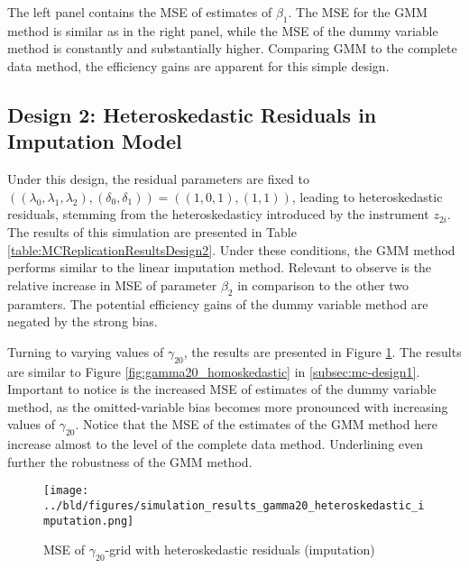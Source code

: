 The left panel contains the MSE of estimates of $\beta_1$.
The MSE for the GMM method is similar as in the right panel, while the MSE of the dummy variable method is constantly and substantially higher.
Comparing GMM to the complete data method, the efficiency gains are apparent for this simple design.

\subsection{Design 2: Heteroskedastic Residuals in Imputation Model}
Under this design, the residual parameters are fixed to $((\lambda_0, \lambda_1, \lambda_2), (\delta_0, \delta_1)) = ((1, 0, 1), (1, 1))$, leading to heteroskedastic residuals, stemming from the heteroskedasticy introduced by the instrument $z_{2i}$.
The results of this simulation are presented in Table \ref{table:MCReplicationResultsDesign2}.
Under these conditions, the GMM method performs similar to the linear imputation method.
Relevant to observe is the relative increase in MSE of parameter $\beta_2$ in comparison to the other two paramters.
The potential efficiency gains of the dummy variable method are negated by the strong bias.



Turning to varying values of $\gamma_{20}$, the results are presented in Figure \ref{fig:gamma20_heteroskedastic_imputation}.
The results are similar to Figure \ref{fig:gamma20_homoskedastic} in \ref{subsec:mc-design1}.
Important to notice is the increased MSE of estimates of the dummy variable method, as the omitted-variable bias becomes more pronounced with increasing values of $\gamma_{20}$.
Notice that the MSE of the estimates of the GMM method here increase almost to the level of the complete data method.
Underlining even further the robustness of the GMM method.

\begin{figure}[H]
    \centering
    \texttt{[image: ../bld/figures/simulation\_results\_gamma20\_heteroskedastic\_imputation.png]}
    \caption{MSE of $\gamma_{20}$-grid with heteroskedastic residuals (imputation)}
    \label{fig:gamma20_heteroskedastic_imputation}
\end{figure}

